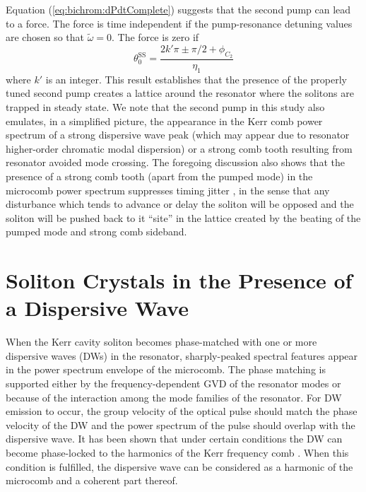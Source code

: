 Equation (\ref{eq:bichrom:dPdtComplete}) suggests that the second pump can lead to a force. The force is time independent if the pump-resonance detuning values are chosen so that $ \tilde{\omega} = 0 $. The force is zero if
%
\begin{equation}\label{eq:bichrom:SSpositions}
\theta_{0}^{\mathrm{SS}} = \frac{2 k' \pi \pm \pi /2 + \phi_{C_2} }{\eta_1}
\end{equation}
%
where $k'$ is an integer. This result establishes that the presence of the properly tuned second pump creates a lattice around the resonator where the solitons are trapped in steady state. We note that the second pump in this study also emulates, in a simplified picture, the appearance in the Kerr comb power spectrum of a strong dispersive wave peak (which may appear due to resonator higher-order chromatic modal dispersion) or a strong comb tooth resulting from resonator avoided mode crossing. The foregoing discussion also shows that the presence of a strong comb tooth (apart from the pumped mode) in the microcomb power spectrum suppresses timing jitter \cite{matsko2013timing}, in the sense that any disturbance which tends to advance or delay the soliton will be opposed and the soliton will be pushed back to it ``site'' in the lattice created by the beating of the pumped mode and strong comb sideband.


\section{Soliton Crystals in the Presence of a Dispersive Wave}
\label{sec:Xtal_DW}

When the Kerr cavity soliton becomes phase-matched with one or more dispersive waves (DWs) in the resonator, sharply-peaked spectral features appear in the power spectrum envelope of the microcomb. The phase matching is supported either by the frequency-dependent GVD of the resonator modes or because of the interaction among the mode families of the resonator. For DW emission to occur, the group velocity of the optical pulse should match the phase velocity of the DW and the power spectrum of the pulse should overlap with the dispersive wave. It has been shown that under certain conditions the DW can become phase-locked to the harmonics of the Kerr frequency comb \cite{akhmediev1995cherenkov, milian2014soliton, taheri2016highorderdisp, herr2014mode, matsko2016cherenkov, vahala2016dw}. When this condition is fulfilled, the dispersive wave can be considered as a harmonic of the microcomb and a coherent part thereof.

